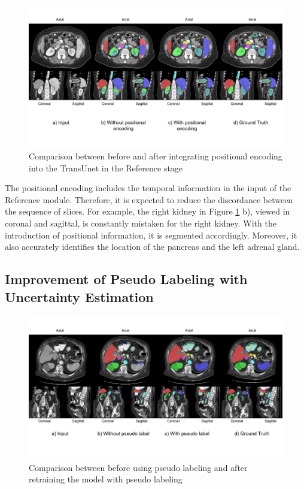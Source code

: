\begin{figure}[!h]
\centering
\includegraphics[width=\textwidth]{content/resources/new_images/qualitative/positional_encoding.pdf}
\caption{Comparison between before and after integrating positional encoding into the TransUnet in the Reference stage}
\label{fig:pe_improvement}
\end{figure}

The positional encoding includes the temporal information in the input of the Reference module. Therefore, it is expected to reduce the discordance between the sequence of slices. For example, the right kidney in Figure \ref{fig:pe_improvement} b), viewed in coronal and sagittal, is constantly mistaken for the right kidney. With the introduction of positional information, it is segmented accordingly. Moreover, it also accurately identifies the location of the pancreas and the left adrenal gland.


\subsection{Improvement of Pseudo Labeling with Uncertainty Estimation}

\begin{figure}[!h]
\centering
\includegraphics[width=\textwidth]{content/resources/new_images/qualitative/pseudo_labeling.pdf}
\caption{Comparison between before using pseudo labeling and after retraining the model with pseudo labeling}
\label{fig:pseudo_labeling_improvement}
\end{figure}


